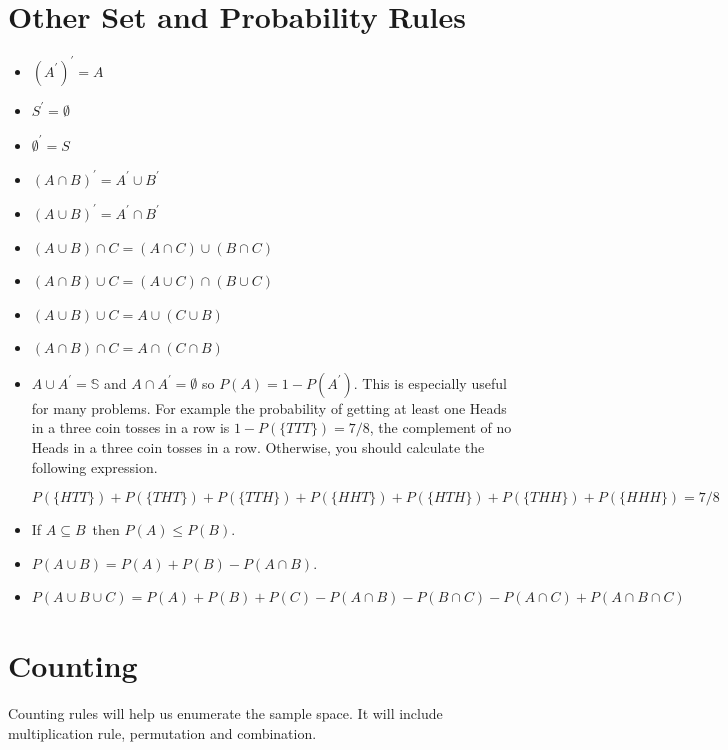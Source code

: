 \documentclass[]{book}
\theoremstyle{definition}
\theoremstyle{definition}
\theoremstyle{definition}
\theoremstyle{remark}
\begin{document}
\hypertarget{other-set-and-probability-rules}{%
\section{Other Set and Probability
Rules}\label{other-set-and-probability-rules}}

\begin{itemize}
\item
  \((A^\prime)^\prime = A\)
\item
  \(S^\prime = \emptyset\)
\item
  \(\emptyset^\prime = S\)
\item
  \((A \cap B)^\prime = A^\prime \cup B^\prime\)
\item
  \((A \cup B)^\prime = A^\prime \cap B^\prime\)
\item
  \((A \cup B) \cap C = (A \cap C) \cup (B \cap C)\)
\item
  \((A \cap B) \cup C = (A \cup C) \cap (B \cup C)\)
\item
  \((A \cup B) \cup C = A \cup (C \cup B)\)
\item
  \((A \cap B) \cap C = A \cap (C \cap B)\)
\item
  \(A \cup A^\prime = \mathbb{S}\) and \(A \cap A^\prime = \emptyset\)
  so \(P(A) = 1 - P(A^\prime)\). This is especially useful for many
  problems. For example the probability of getting at least one Heads in
  a three coin tosses in a row is \(1 - P(\{TTT\}) = 7/8\), the
  complement of no Heads in a three coin tosses in a row. Otherwise, you
  should calculate the following expression.

  \[P(\{HTT\}) + P(\{THT\}) + P(\{TTH\}) + P(\{HHT\}) + P(\{HTH\}) + P(\{THH\}) + P(\{HHH\}) = 7/8 \]
\item
  If \(A \subseteq B\)~then \(P(A) \le P(B)\).
\item
  \(P(A \cup B) = P(A) + P(B) - P(A \cap B)\).
\item
  \(P(A \cup B \cup C) = P(A) + P(B) + P(C) - P(A \cap B) - P(B \cap C) - P(A \cap C) + P(A \cap B \cap C)\)
\end{itemize}

\hypertarget{counting}{%
\section{Counting}\label{counting}}

Counting rules will help us enumerate the sample space. It will include
multiplication rule, permutation and combination.
\end{document}
